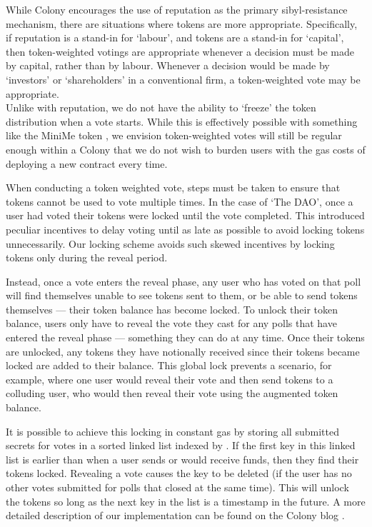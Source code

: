 While Colony encourages the use of reputation as the primary sibyl-resistance mechanism, there are situations where tokens are more appropriate. Specifically, if reputation is a stand-in for `labour', and tokens are a stand-in for `capital', then token-weighted votings are appropriate whenever a decision must be made by capital, rather than by labour. Whenever a decision would be made by `investors' or `shareholders' in a conventional firm, a token-weighted vote may be appropriate. \\

Unlike with reputation, we do not have the ability to `freeze' the token distribution when a vote starts. While this is effectively possible with something like the MiniMe token \cite{minime}, we envision token-weighted votes will still be regular enough within a Colony that we do not wish to burden users with the gas costs of deploying a new contract every time.

When conducting a token weighted vote, steps must be taken to ensure that tokens cannot be used to vote multiple times. In the case of `The DAO', once a user had voted their tokens were locked until the vote completed. This introduced peculiar incentives to delay voting until as late as possible to avoid locking tokens unnecessarily.  Our locking scheme avoids such skewed incentives by locking tokens only during the reveal period.

Instead, once a vote enters the reveal phase, any user who has voted on that poll will find themselves unable to see tokens sent to them, or be able to send tokens themselves --- their token balance has become locked. To unlock their token balance, users only have to reveal the vote they cast for any polls that have entered the reveal phase --- something they can do at any time. Once their tokens are unlocked, any tokens they have notionally received since their tokens became locked are added to their balance. This global lock prevents a scenario, for example, where one user would reveal their vote and then send tokens to a colluding user, who would then reveal their vote using the augmented token balance.

It is possible to achieve this locking in constant gas by storing all submitted secrets for votes in a sorted linked list indexed by . If the first key in this linked list is earlier than  when a user sends or would receive funds, then they find their tokens locked. Revealing a vote causes the key to be deleted (if the user has no other votes submitted for polls that closed at the same time). This will unlock the tokens so long as the next key in the list is a timestamp in the future. A more detailed description of our implementation can be found on the Colony blog \cite{ColonyVoting}.

